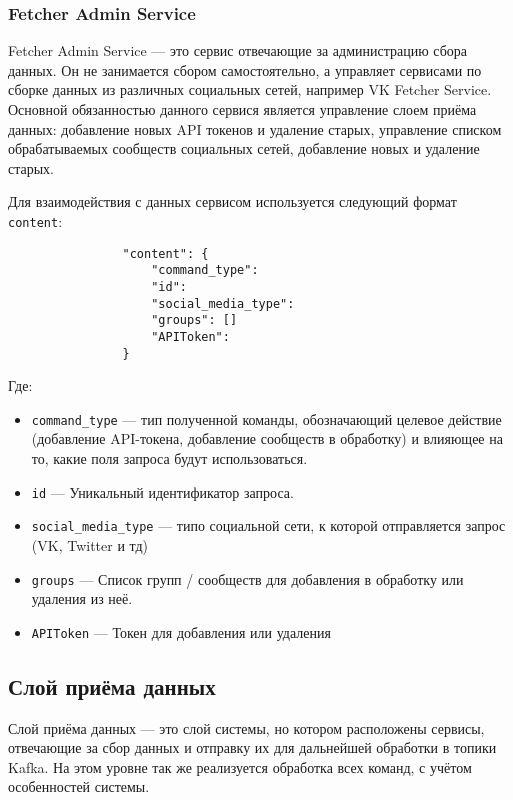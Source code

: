         \subsubsection{Fetcher Admin Service}
            Fetcher Admin Service — это сервис отвечающие за администрацию сбора данных. Он не занимается сбором самостоятельно, а управляет сервисами по сборке данных из различных социальных сетей, например VK Fetcher Service. Основной обязанностью данного сервися является управление слоем приёма данных: добавление новых API токенов и удаление старых, управление списком обрабатываемых сообществ социальных сетей, добавление новых и удаление старых.

            Для взаимодействия с данных сервисом используется следующий формат \texttt{content}:
            \begin{lstlisting}
                "content": {
                    "command_type":
                    "id":
                    "social_media_type":
                    "groups": []
                    "APIToken":
                }   
            \end{lstlisting}
            Где:
            \begin{itemize}
                \item \texttt{command\_type} — тип полученной команды, обозначающий целевое действие (добавление API-токена, добавление сообществ в обработку) и влияющее на то, какие поля запроса будут использоваться.
                \item \texttt{id} — Уникальный идентификатор запроса.
                \item \texttt{social\_media\_type} — типо социальной сети, к которой отправляется запрос (VK, Twitter и тд)
                \item \texttt{groups} — Список групп / сообществ для добавления в обработку или удаления из неё.
                \item \texttt{APIToken} — Токен для добавления или удаления
            \end{itemize}

    \subsection{Слой приёма данных}
        Слой приёма данных — это слой системы, но котором расположены сервисы, отвечающие за сбор данных и отправку их для дальнейшей обработки в топики Kafka. На этом уровне так же реализуется обработка всех команд, с учётом особенностей системы. 

